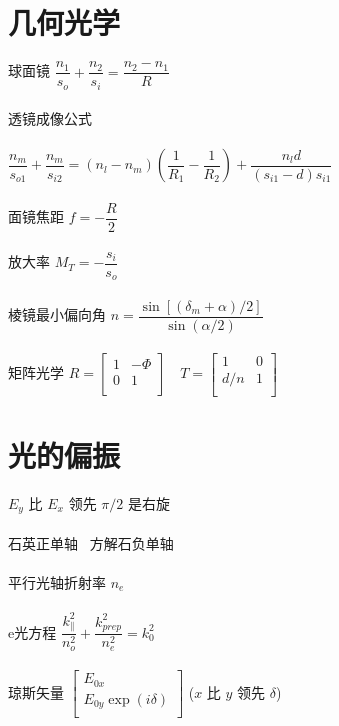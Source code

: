 \documentclass{article}
\begin{document}
\begin{multicols}{2}
\section{几何光学}

球面镜 $\dfrac{n_1}{s_o} + \dfrac{n_2}{s_i} = \dfrac{n_2 - n_1}{R}  $
\\\\
透镜成像公式
\\\\
$\dfrac{n_m}{s_{o1}} + \dfrac{n_m}{s_{i2}} = \left( n_l - n_m \right) \left( \dfrac{1}{R_1} - \dfrac{1}{R_2}   \right) + \dfrac{n_l d}{\left( s_{i1} - d \right)s_{i1}}   $
\\\\
面镜焦距 $f = - \dfrac{R}{2} $
\\\\
放大率 $M_T = - \dfrac{s_i}{s_o} $
\\\\
棱镜最小偏向角 $n = \dfrac{\sin \left[ \left( \delta_m + \alpha \right) / 2 \right]}{\sin \left( \alpha / 2 \right)} $
\\\\
矩阵光学 $R = \left[
  \begin{array}{ccc}
   1 & - \Phi \\
   0 & 1 \\
  \end{array}
\right ]
\quad T = \left[
  \begin{array}{ccc}
   1 & 0 \\
   d/n & 1 \\
  \end{array}
\right ]
$

\section{光的偏振}

$E_y$ 比 $E_x$ 领先 $\pi/2$ 是右旋
\\\\
石英正单轴 \ 方解石负单轴
\\\\
平行光轴折射率 $n_e$
\\\\
e光方程 $\dfrac{k_{\parallel}^2}{n_o^2} + \dfrac{k_{prep}^2}{n_e^2} = k_0^2  $
\\\\
琼斯矢量 $\left[
  \begin{array}{cc}
   E_{0x} \\
   E_{0y} \exp \left( i \delta \right)  \\
  \end{array}
\right ]
$ ($x$ 比 $y$ 领先 $\delta$)


\end{multicols}
\end{document}
